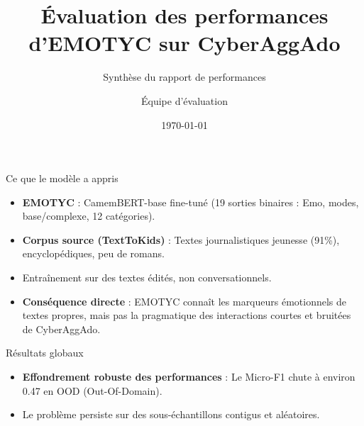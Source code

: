 \documentclass{beamer}
\title[Évaluation EMOTYC]{Évaluation des performances d'EMOTYC sur CyberAggAdo}
\subtitle{Synthèse du rapport de performances}
\author{Équipe d'évaluation}
\date{\today}
\begin{document}
\begin{frame}
    \titlepage
\end{frame}

\begin{frame}{Ce que le modèle a appris}
    \begin{itemize}
        \item \textbf{EMOTYC} : CamemBERT-base fine-tuné (19 sorties binaires : Emo, modes, base/complexe, 12 catégories).
        \item \textbf{Corpus source (TextToKids)} : Textes journalistiques jeunesse (91\%), encyclopédiques, peu de romans.
        \item Entraînement sur des textes édités, non conversationnels.
        \item \textbf{Conséquence directe} : EMOTYC connaît les marqueurs émotionnels de textes propres, mais pas la pragmatique des interactions courtes et bruitées de CyberAggAdo.
    \end{itemize}
\end{frame}

\begin{frame}{Résultats globaux}
    \begin{table}[]
    \end{table}
    \vspace{0.5cm}
    \begin{itemize}
        \item \textbf{Effondrement robuste des performances} : Le Micro-F1 chute à environ 0.47 en OOD (Out-Of-Domain).
        \item Le problème persiste sur des sous-échantillons contigus et aléatoires.
    \end{itemize}
\end{frame}
\end{document}
